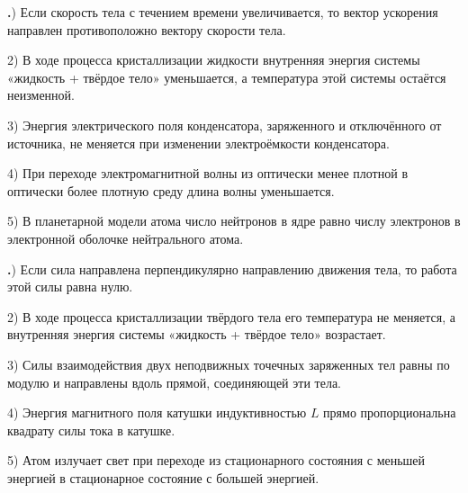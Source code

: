 \documentclass[12pt,a4paper]{article}
\newif\ifShowSolutions
\newcounter{banktask}
\newcommand{\BankTask}[3]{%
  \refstepcounter{banktask}%
  \Needspace{35mm}\par\medskip\noindent\begin{minipage}{\linewidth}%
  \noindent\textbf{\thebanktask.}\quad #2\par
  \ifShowSolutions
    #3\par
    \ifdefined\TutorEdition
      \ifcsname TutorSource#1\endcsname
        \smallskip{\small\csname TutorSource#1\endcsname\par}%
      \fi
    \fi
  \fi
  \end{minipage}\par\medskip
}
\begin{document}
\BankTask{eeAe26}{
1) Если скорость тела с течением времени увеличивается, то вектор ускорения направлен противоположно вектору скорости тела.
\par
2) В ходе процесса кристаллизации жидкости внутренняя энергия системы «жидкость + твёрдое тело» уменьшается, а температура этой системы остаётся неизменной.
\par
3) Энергия электрического поля конденсатора, заряженного и отключённого от источника, не меняется при изменении электроёмкости конденсатора.
\par
4) При переходе электромагнитной волны из оптически менее плотной в оптически более плотную среду длина волны уменьшается.
\par
5) В планетарной модели атома число нейтронов в ядре равно числу электронов в электронной оболочке нейтрального атома.
}{
\smallskip\noindent\textbf{Решение от GPT}\par
1) Неверно: при увеличении модуля скорости \(\vec a\cdot\vec v>0\), поэтому ускорение не может быть направлено противоположно скорости.
2) Верно: при кристаллизации выделяется теплота, внутренняя энергия уменьшается, а температура остаётся постоянной.
3) Неверно: у отключённого конденсатора заряд \(q\) сохраняется, поэтому энергия \(W=q^2/(2C)\) изменяется при изменении \(C\).
4) Верно: частота сохраняется, скорость распространения уменьшается, поэтому длина волны \(\lambda=v/\nu\) уменьшается.
5) Неверно: в нейтральном атоме число электронов равно числу протонов, а не нейтронов; ответ: \(2,\ 4\).
}

\BankTask{D92DAA}{
1) Если сила направлена перпендикулярно направлению движения тела, то работа этой силы равна нулю.
\par
2) В ходе процесса кристаллизации твёрдого тела его температура не меняется, а внутренняя энергия системы «жидкость + твёрдое тело» возрастает.
\par
3) Силы взаимодействия двух неподвижных точечных заряженных тел равны по модулю и направлены вдоль прямой, соединяющей эти тела.
\par
4) Энергия магнитного поля катушки индуктивностью \(L\) прямо пропорциональна квадрату силы тока в катушке.
\par
5) Атом излучает свет при переходе из стационарного состояния с меньшей энергией в стационарное состояние с большей энергией.
}{
\smallskip\noindent\textbf{Решение от GPT}\par
1) Верно: при перпендикулярности силы и перемещения \(A=Fs\cos 90^\circ=0\).
2) Неверно: при кристаллизации жидкости внутренняя энергия системы «жидкость + твёрдое тело» уменьшается.
3) Верно: кулоновские силы направлены вдоль соединяющей заряды прямой и по третьему закону Ньютона равны по модулю.
4) Верно: энергия магнитного поля катушки \(W=LI^2/2\).
5) Неверно: излучение происходит при переходе на уровень с меньшей энергией, причём \(h\nu=E_{\text{нач}}-E_{\text{кон}}>0\); ответ: \(1,\ 3,\ 4\).
}
\end{document}
